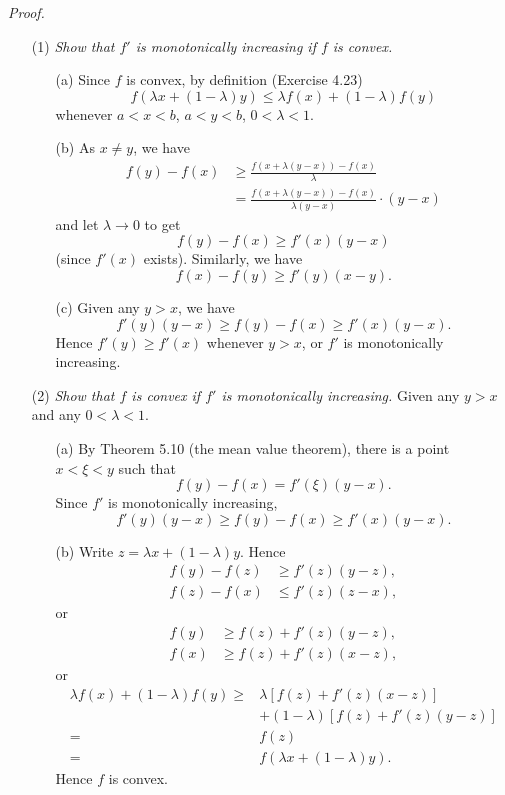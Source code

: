 \documentclass{article}
\begin{document}
\emph{Proof.}
\begin{enumerate}
\item[(1)]
  \emph{Show that $f'$ is monotonically increasing if $f$ is convex.}
  \begin{enumerate}
  \item[(a)]
  Since $f$ is convex, by definition (Exercise 4.23)
  \[
    f(\lambda x + (1-\lambda) y) \leq \lambda f(x) + (1-\lambda) f(y)
  \]
  whenever $a < x < b$, $a < y < b$, $0 < \lambda < 1$.

  \item[(b)]
  As $x \neq y$, we have
  \begin{align*}
    f(y) - f(x)
    &\geq \frac{f(x + \lambda(y-x)) - f(x)}{\lambda} \\
    &= \frac{f(x + \lambda(y-x)) - f(x)}{\lambda(y-x)} \cdot (y-x)
  \end{align*}
  and let $\lambda \to 0$ to get
  \[
    f(y) - f(x) \geq f'(x)(y - x)
  \]
  (since $f'(x)$ exists).
  Similarly, we have
  \[
    f(x) - f(y) \geq f'(y)(x - y).
  \]

  \item[(c)]
  Given any $y > x$, we have
  \[
    f'(y)(y - x) \geq f(y) - f(x) \geq f'(x)(y - x).
  \]
  Hence $f'(y) \geq f'(x)$ whenever $y > x$,
  or $f'$ is monotonically increasing.
  \end{enumerate}

\item[(2)]
  \emph{Show that $f$ is convex if $f'$ is monotonically increasing.}
  Given any $y > x$ and any $0 < \lambda < 1$.
  \begin{enumerate}
  \item[(a)]
  By Theorem 5.10 (the mean value theorem), there is a point $x < \xi < y$ such that
  \[
    f(y) - f(x) = f'(\xi)(y - x).
  \]
  Since $f'$ is monotonically increasing,
  \[
    f'(y)(y - x) \geq f(y) - f(x) \geq f'(x)(y - x).
  \]

  \item[(b)]
  Write $z = \lambda x + (1-\lambda)y$.
  Hence
  \begin{align*}
    f(y)-f(z) &\geq f'(z)(y-z), \\
    f(z)-f(x) &\leq f'(z)(z-x),
  \end{align*}
  or
  \begin{align*}
    f(y) &\geq f(z) + f'(z)(y-z), \\
    f(x) &\geq f(z) + f'(z)(x-z),
  \end{align*}
  or
  \begin{align*}
    \lambda f(x) + (1-\lambda)f(y)
    \geq&
    \lambda [f(z) + f'(z)(x-z)] \\
      &+ (1-\lambda)[f(z) + f'(z)(y-z)] \\
    =& f(z) \\
    =& f(\lambda x + (1-\lambda)y).
  \end{align*}
  Hence $f$ is convex.
  \end{enumerate}


\end{enumerate}
\end{document}
